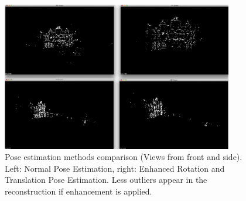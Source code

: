 \begin{figure}[p]
    \centering
    \includegraphics[width=0.9\textwidth]{PoseEstimationMethodComparison}
    \caption[Pose estimation methods comparison]{Pose estimation methods comparison (Views from front and side). Left: Normal Pose Estimation, right: Enhanced Rotation and Translation Pose Estimation. Less outliers appear in the reconstruction if enhancement is applied.}
    \label{fig:PoseEstimationMethodComparison}
\end{figure}
